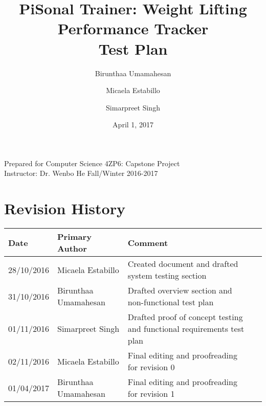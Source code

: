 \documentclass{article}
\title{
PiSonal Trainer: Weight Lifting Performance Tracker\\
\Large {Test Plan}
}
\date{April 1, 2017}
\author{Birunthaa Umamahesan \and Micaela Estabillo \and Simarpreet Singh}
\begin{document}
\maketitle
\thispagestyle{empty}
\vfill
\begin{center}
    Prepared for Computer Science 4ZP6: Capstone Project \\
    Instructor: Dr. Wenbo He
    Fall/Winter 2016-2017\\
\end{center}
\newpage

\tableofcontents

\listoftables


\section*{Revision History}
\begingroup
\begin{tabular}{ | p{2cm} | p{1.5cm} | p{3.8cm} | p{7cm} |} 
    \hline
    \textbf{Date} &  \textbf{Primary Author} & \textbf{Comment}\\
    \hline
    28/10/2016 &  Micaela Estabillo & Created document and drafted system testing section\\ 
    \hline
    31/10/2016 & Birunthaa Umamahesan & Drafted overview section and non-functional test plan\\
    \hline
    01/11/2016 & Simarpreet Singh & Drafted proof of concept testing and functional requirements test plan \\
    \hline
    02/11/2016 &  Micaela Estabillo & Final editing and proofreading for revision 0\\
    \hline
    01/04/2017 & Birunthaa Umamahesan & Final editing and proofreading for revision 1\\
    \hline
\end{tabular}
\endgroup

\newpage

\end{document}
